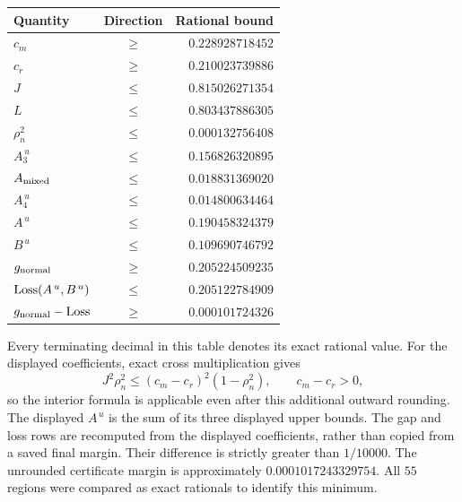 \begin{center}
\begin{tabular}{lcr}
\toprule
Quantity & Direction & Rational bound\\
\midrule
$c_m$ & $\ge$ & $0.228928718452$\\
$c_r$ & $\ge$ & $0.210023739886$\\
$J$ & $\le$ & $0.815026271354$\\
$L$ & $\le$ & $0.803437886305$\\
$\rho_n^2$ & $\le$ & $0.000132756408$\\
$A_3^{\,u}$ & $\le$ & $0.156826320895$\\
$A_{\rm mixed}$ & $\le$ & $0.018831369020$\\
$A_4^{\,u}$ & $\le$ & $0.014800634464$\\
$A^{\,u}$ & $\le$ & $0.190458324379$\\
$B^{\,u}$ & $\le$ & $0.109690746792$\\
$g_{\rm normal}$ & $\ge$ & $0.205224509235$\\
${\rm Loss}(A^{\,u},B^{\,u})$ & $\le$ & $0.205122784909$\\
$g_{\rm normal}-{\rm Loss}$ & $\ge$ & $0.000101724326$\\
\bottomrule
\end{tabular}
\end{center}
Every terminating decimal in this table denotes its exact rational value.
For the displayed coefficients, exact cross multiplication gives
\[
 J^2\rho_n^2\le(c_m-c_r)^2(1-\rho_n^2),\qquad c_m-c_r>0,
\]
so the interior formula is applicable even after this additional outward rounding.
The displayed $A^{\,u}$ is the sum of its three displayed upper bounds.
The gap and loss rows are recomputed from the displayed coefficients, rather than
copied from a saved final margin. Their difference is strictly greater than
$1/10000$. The unrounded certificate margin is approximately $0.0001017243329754$.
All $55$ regions were compared as exact rationals to identify this minimum.
